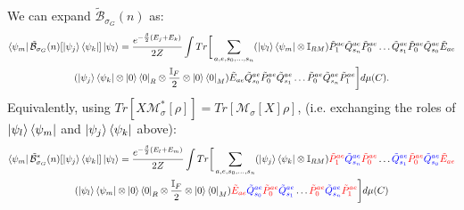 We can expand $\tilde{\mathcal{B}}_{\sigma_G}(n)$ as:
\begin{multline}
    \bra{\psi_m}\tilde{\mathcal{B}}_{\sigma_G}(n)[\ket{\psi_j}\bra{\psi_k}]\ket{\psi_l} = \frac{e^{-\frac{\beta}{2}(E_j+E_k)}}{2Z}\int Tr\bigg[ \sum_{a,e,s_0,\ldots,s_n}(\ket{\psi_l}\bra{\psi_m}\otimes \mathbb{I}_{RM})\tilde P^{ae}_1\tilde Q^{ae}_{s_n}\tilde P^{ae}_0\ldots\tilde Q^{ae}_{s_1}\tilde P^{ae}_0\tilde Q^{ae}_{s_0}\tilde E_{ae} \\(\ket{\psi_j}\bra{\psi_k}\otimes \ket{0}\bra{0}_R\otimes \frac{\mathbb{I}_F}{2}\otimes \ket{0}\bra{0}_M)  \tilde E_{ae}\tilde Q^{ae}_{s_0}\tilde P^{ae}_0\tilde Q^{ae}_{s_1}\ldots\tilde P^{ae}_0\tilde Q^{ae}_{s_n}\tilde P^{ae}_1\bigg]d\mu(C).
\end{multline}
Equivalently, using $Tr[X\mathcal{M}^*_{\sigma}[\rho]] = Tr[\mathcal{M}_{\sigma}[X]\rho]$, (i.e. exchanging the roles of $\ket{\psi_l}\bra{\psi_m}$ and $\ket{\psi_j}\bra{\psi_k}$ above):
\begin{multline}
       \bra{\psi_m}\tilde{\mathcal{B}}^*_{\sigma_G}(n)[\ket{\psi_j}\bra{\psi_k}]\ket{\psi_l} = \frac{e^{-\frac{\beta}{2}(E_l+E_m)}}{2Z}\int Tr\bigg[ \sum_{a,e,s_0,\ldots,s_n}(\ket{\psi_j}\bra{\psi_k}\otimes \mathbb{I}_{RM})\textcolor{red}{\tilde P^{ae}_1}\textcolor{blue}{\tilde Q^{ae}_{s_n}}\textcolor{red}{\tilde P^{ae}_0}\ldots\textcolor{blue}{\tilde Q^{ae}_{s_1}}\textcolor{red}{\tilde P^{ae}_0}\textcolor{blue}{\tilde Q^{ae}_{s_0}}\textcolor{red}{\tilde E_{ae}} \\(\ket{\psi_l}\bra{\psi_m}\otimes \ket{0}\bra{0}_R\otimes \frac{\mathbb{I}_F}{2}\otimes \ket{0}\bra{0}_M)  \textcolor{red}{\tilde E_{ae}}\textcolor{blue}{\tilde Q^{ae}_{s_0}}\textcolor{red}{\tilde P^{ae}_0}\textcolor{blue}{\tilde Q^{ae}_{s_1}}\ldots\textcolor{red}{\tilde P^{ae}_0}\textcolor{blue}{\tilde Q^{ae}_{s_n}}\textcolor{red}{\tilde P^{ae}_1}\bigg]d\mu(C)
    \label{eq:Bstarexpanded}
\end{multline}
